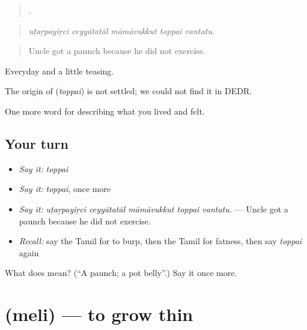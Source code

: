 \begin{quote}
    .
\end{quote}

\begin{quote}
\emph{uṭaṟpayiṟci ceyyātatāl māmāvukkut toppai vantatu.}
\end{quote}

\begin{quote}
Uncle got a paunch because he did not exercise.
\end{quote}

Everyday and a little teasing.

\begin{cousinweb}
The origin of \textbf{} (\emph{toppai}) is not settled; we could not find it in DEDR.
\end{cousinweb}

\begin{grammarlens}[title={What you've built}]
One more word for describing what you lived and felt.
\end{grammarlens}

\subsection*{Your turn}
\begin{itemize}
\raggedright
  \item \emph{Say it:} \emph{toppai}
  \item \emph{Say it:} \emph{toppai}, once more
  \item \emph{Say it:} \emph{uṭaṟpayiṟci ceyyātatāl māmāvukkut toppai vantatu.} — Uncle got a paunch because he did not exercise.
  \item \emph{Recall:} say the Tamil for to burp, then the Tamil for fatness, then say \emph{toppai} again
\end{itemize}

\begin{tcolorbox}[breakable,colback=teal!4,colframe=teal!35!black,title={Before you move on}]
What does  mean? (\textquotedblleft{}A paunch; a pot belly\textquotedblright{}.) Say it once more.
\end{tcolorbox}
\section[\texorpdfstring{\ta{மெலி} (meli)}{மெலி (meli)}]{ (meli) — to grow thin}

